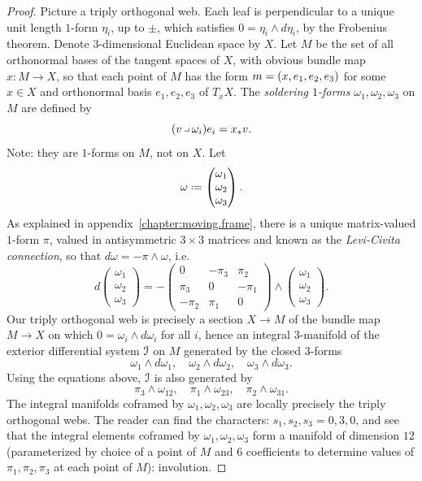 \begin{proof}
Picture a triply orthogonal web.
Each leaf is perpendicular to a unique unit length \(1\)-form \(\eta_i\), up to \(\pm\), which satisfies \(0=\eta_i \wedge d \eta_i\), by the Frobenius theorem.
Denote \(3\)-dimensional Euclidean space by \(X\).
Let \(M\) be the set of all orthonormal bases of the tangent spaces of \(X\), with obvious bundle map \(x \colon M \to X\), so that each point of \(M\) has the form \(m=\left(x,e_1,e_2,e_3\right)\) for some \(x \in X\) and orthonormal basis \(e_1,e_2,e_3\) of \(T_x X\).
The \emph{soldering \(1\)-forms} \(\omega_1, \omega_2, \omega_3\) on \(M\) are defined by 
\[
(v \hook \omega_i)e_i = x_* v.
\]
Note: they are \(1\)-forms on \(M\), not on \(X\).
Let 
\[
\omega
\defeq
\begin{pmatrix}
\omega_1 \\
\omega_2 \\
\omega_3
\end{pmatrix}.
\]
As explained in appendix~\ref{chapter:moving.frame}, there is a unique matrix-valued \(1\)-form \(\pi\), valued in antisymmetric \(3 \times 3\) matrices and known as the \emph{Levi-Civita connection}, so that \(d \omega = -\pi \wedge \omega\), i.e.
\[
d
\begin{pmatrix}
\omega_1 \\
\omega_2 \\
\omega_3
\end{pmatrix}
=
-
\begin{pmatrix}
0 & -\pi_3 & \pi_2 \\
\pi_3 & 0 & -\pi_1 \\
-\pi_2 & \pi_1 & 0
\end{pmatrix}
\wedge
\begin{pmatrix}
\omega_1 \\
\omega_2 \\
\omega_3
\end{pmatrix}.
\]
Our triply orthogonal web is precisely a section \(X \to M\) of the bundle map \(M \to X\) on which \(0=\omega_i \wedge d\omega_i\) for all \(i\), hence an integral \(3\)-manifold of the exterior differential system \(\mathcal{I}\) on \(M\) generated by the closed \(3\)-forms
\[
\omega_1 \wedge d \omega_1, \quad
\omega_2 \wedge d \omega_2, \quad
\omega_3 \wedge d \omega_3.
\]
Using the equations above, \(\mathcal{I}\) is also generated by
\[
\pi_3 \wedge \omega_{12}, \quad
\pi_1 \wedge \omega_{23}, \quad
\pi_2 \wedge \omega_{31}.
\]
The integral manifolds coframed by \(\omega_1,\omega_2,\omega_3\) are locally precisely the triply orthogonal webs.
The reader can find the characters: \(s_1,s_2,s_3=0,3,0\), and see that the integral elements coframed by \(\omega_1,\omega_2,\omega_3\) form a manifold of dimension \(12\) (parameterized by choice of a point of \(M\) and \(6\) coefficients to determine values of \(\pi_1,\pi_2,\pi_3\) at each point of \(M\)): involution.
\end{proof}
